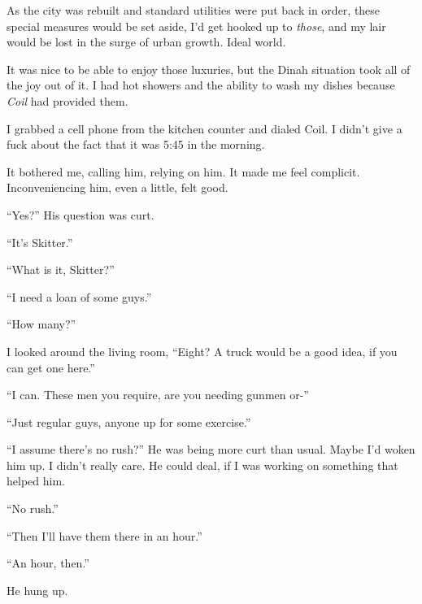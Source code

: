 As the city was rebuilt and standard utilities were put back in order, these special measures would be set aside, I'd get hooked up to \emph{those}, and my lair would be lost in the surge of urban growth.  Ideal world.



It was nice to be able to enjoy those luxuries, but the Dinah situation took all of the joy out of it.  I had hot showers and the ability to wash my dishes because \emph{Coil} had provided them.



I grabbed a cell phone from the kitchen counter and dialed Coil.  I didn't give a fuck about the fact that it was 5:45 in the morning.



It bothered me, calling him, relying on him.  It made me feel complicit.  Inconveniencing him, even a little, felt good.



``Yes?''  His question was curt.



``It's Skitter.''



``What is it, Skitter?''



``I need a loan of some guys.''



``How many?''



I looked around the living room, ``Eight?  A truck would be a good idea, if you can get one here.''



``I can.  These men you require, are you needing gunmen or-''



``Just regular guys, anyone up for some exercise.''



``I assume there's no rush?''  He was being more curt than usual.  Maybe I'd woken him up.  I didn't really care.  He could deal, if I was working on something that helped him.



``No rush.''



``Then I'll have them there in an hour.''



``An hour, then.''



He hung up.



